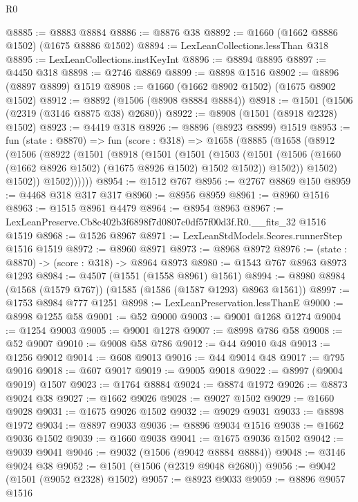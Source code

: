 \begin{lexlean}{R0}
\begin{coremodule}
@8885 := @8883 @8884
@8886 := @8876 @38
@8892 := @1660 (@1662 @8886 @1502) (@1675 @8886 @1502)
@8894 := LexLeanCollections.lessThan @318
@8895 := LexLeanCollections.instKeyInt
@8896 := @8894 @8895
@8897 := @4450 @318
@8898 := @2746 @8869
@8899 := @8898 @1516
@8902 := @8896 (@8897 @8899) @1519
@8908 := @1660 (@1662 @8902 @1502) (@1675 @8902 @1502)
@8912 := @8892 (@1506 (@8908 @8884 @8884))
@8918 := @1501 (@1506 (@2319 (@3146 @8875 @38) @2680))
@8922 := @8908 (@1501 (@8918 @2328) @1502)
@8923 := @4419 @318
@8926 := @8896 (@8923 @8899) @1519
@8953 := fun (state : @8870) =>
  fun (score : @318) =>
  @1658
    (@8885
      (@1658
        (@8912
          (@1506
            (@8922
              (@1501
                (@8918
                  (@1501
                    (@1501
                      (@1503
                        (@1501
                          (@1506 (@1660 (@1662 @8926 @1502) (@1675 @8926 @1502) @1502 @1502))
                          @1502))
                      @1502)
                    @1502))
                @1502))))))
@8954 := @1512 @767
@8956 := @2767 @8869 @150
@8959 := @4468 @318 @317 @317
@8960 := @8956 @8959
@8961 := @8960 @1516
@8963 := @1515 @8961 @4479
@8964 := @8954 @8963
@8967 := LexLeanPreserve.Cb8c402b3f6898f7d0807c0df57f00d3f.R0.__fits_32 @1516 @1519
@8968 := @1526 @8967
@8971 := LexLeanStdModels.Scores.runnerStep @1516 @1519
@8972 := @8960 @8971
@8973 := @8968 @8972
@8976 := (state : @8870) -> (score : @318) -> @8964 @8973
@8980 := @1543 @767 @8963 @8973 @1293
@8984 := @4507 (@1551 (@1558 @8961) @1561)
@8994 := @8980 @8984 (@1568 (@1579 @767)) (@1585 (@1586 (@1587 @1293) @8963 @1561))
@8997 := @1753 @8984 @777 @1251
@8998 := LexLeanPreservation.lessThanE
@9000 := @8998 @1255 @58
@9001 := @52 @9000
@9003 := @9001 @1268 @1274
@9004 := @1254 @9003
@9005 := @9001 @1278
@9007 := @8998 @786 @58
@9008 := @52 @9007
@9010 := @9008 @58 @786
@9012 := @44 @9010 @48
@9013 := @1256 @9012
@9014 := @608 @9013
@9016 := @44 @9014 @48
@9017 := @795 @9016
@9018 := @607 @9017
@9019 := @9005 @9018
@9022 := @8997 (@9004 @9019) @1507
@9023 := @1764 @8884
@9024 := @8874 @1972
@9026 := @8873 @9024 @38
@9027 := @1662 @9026
@9028 := @9027 @1502
@9029 := @1660 @9028
@9031 := @1675 @9026 @1502
@9032 := @9029 @9031
@9033 := @8898 @1972
@9034 := @8897 @9033
@9036 := @8896 @9034 @1516
@9038 := @1662 @9036 @1502
@9039 := @1660 @9038
@9041 := @1675 @9036 @1502
@9042 := @9039 @9041
@9046 := @9032 (@1506 (@9042 @8884 @8884))
@9048 := @3146 @9024 @38
@9052 := @1501 (@1506 (@2319 @9048 @2680))
@9056 := @9042 (@1501 (@9052 @2328) @1502)
@9057 := @8923 @9033
@9059 := @8896 @9057 @1516

\end{coremodule}
\end{lexlean}
